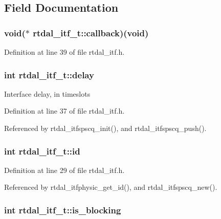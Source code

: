 \subsection{Field Documentation}
\subsubsection[{callback}]{\setlength{\rightskip}{0pt plus 5cm}void($\ast$ rtdal\-\_\-itf\-\_\-t\-::callback)(void)}\label{structrtdal__itf__t_a64be55b2d31d03289ec240ce3531f4d0}


Definition at line 39 of file rtdal\-\_\-itf.\-h.

\subsubsection[{delay}]{\setlength{\rightskip}{0pt plus 5cm}int rtdal\-\_\-itf\-\_\-t\-::delay}\label{structrtdal__itf__t_ac8c1717c2f6c250ffb99b645c54060ea}
Interface delay, in timeslots 

Definition at line 37 of file rtdal\-\_\-itf.\-h.



Referenced by rtdal\-\_\-itfspscq\-\_\-init(), and rtdal\-\_\-itfspscq\-\_\-push().

\subsubsection[{id}]{\setlength{\rightskip}{0pt plus 5cm}int rtdal\-\_\-itf\-\_\-t\-::id}\label{structrtdal__itf__t_a454450582d66e41b8d7388cc00979227}


Definition at line 29 of file rtdal\-\_\-itf.\-h.



Referenced by rtdal\-\_\-itfphysic\-\_\-get\-\_\-id(), and rtdal\-\_\-itfspscq\-\_\-new().

\subsubsection[{is\-\_\-blocking}]{\setlength{\rightskip}{0pt plus 5cm}int rtdal\-\_\-itf\-\_\-t\-::is\-\_\-blocking}\label{structrtdal__itf__t_a46040cf579288e274af70c0f517ba70a}



